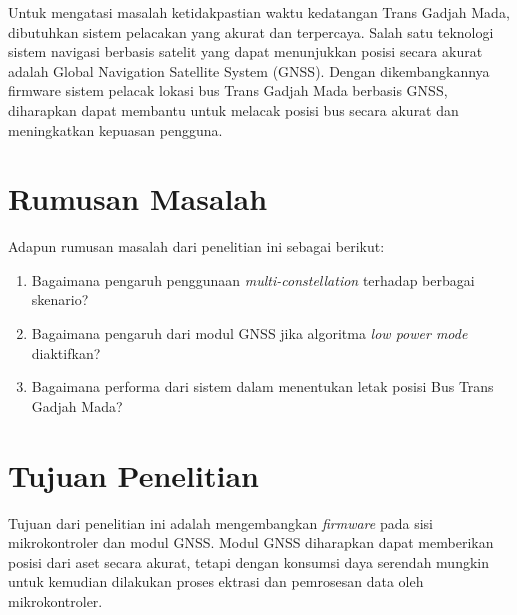 Untuk mengatasi masalah ketidakpastian waktu kedatangan Trans Gadjah Mada, dibutuhkan sistem pelacakan yang akurat dan terpercaya. Salah satu teknologi sistem navigasi berbasis satelit yang dapat menunjukkan posisi secara akurat adalah Global Navigation Satellite System (GNSS). Dengan dikembangkannya firmware sistem pelacak lokasi bus Trans Gadjah Mada berbasis GNSS, diharapkan dapat membantu untuk melacak posisi bus secara akurat dan meningkatkan kepuasan pengguna.

\section{Rumusan Masalah}
Adapun rumusan masalah dari penelitian ini sebagai berikut:
\begin{enumerate}
	\item Bagaimana pengaruh penggunaan \textit{multi-constellation} terhadap berbagai skenario?
	\item Bagaimana pengaruh dari modul GNSS jika algoritma \textit{low power mode} diaktifkan?
	\item Bagaimana performa dari sistem dalam menentukan letak posisi Bus Trans Gadjah Mada?
\end{enumerate}

\section{Tujuan Penelitian}
Tujuan dari penelitian ini adalah mengembangkan \textit{firmware} pada sisi mikrokontroler dan modul GNSS. Modul GNSS diharapkan dapat memberikan posisi dari aset secara akurat, tetapi dengan konsumsi daya serendah mungkin untuk kemudian dilakukan proses ektrasi dan pemrosesan data oleh mikrokontroler.

